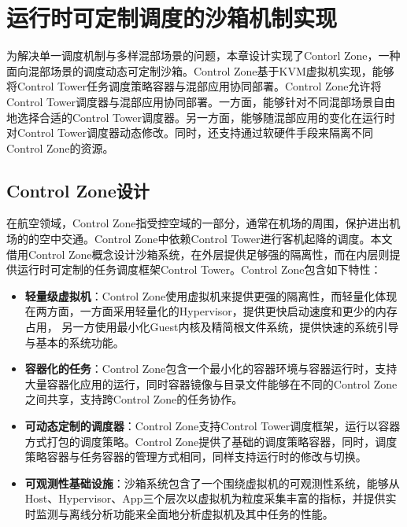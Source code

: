 \chapter{运行时可定制调度的沙箱机制实现}\label{chap:control_zone}

为解决单一调度机制与多样混部场景的问题，本章设计实现了Contorl Zone，一种面向混部场景的调度动态可定制沙箱。Control Zone基于KVM虚拟机实现，能够将Control Tower任务调度策略容器与混部应用协同部署。Control Zone允许将Control Tower调度器与混部应用协同部署。一方面，能够针对不同混部场景自由地选择合适的Control Tower调度器。另一方面，能够随混部应用的变化在运行时对Control Tower调度器动态修改。同时，还支持通过软硬件手段来隔离不同Control Zone的资源。

\section{Control Zone设计}



在航空领域，Control Zone指受控空域的一部分，通常在机场的周围，保护进出机场的的空中交通。Control Zone中依赖Control Tower进行客机起降的调度。本文借用Control Zone概念设计沙箱系统，在外层提供足够强的隔离性，而在内层则提供运行时可定制的任务调度框架Control Tower。Control Zone包含如下特性：

\begin{itemize}
    \item \textbf{轻量级虚拟机}：Control Zone使用虚拟机来提供更强的隔离性，而轻量化体现在两方面，一方面采用轻量化的Hypervisor，提供更快启动速度和更少的内存占用， 另一方使用最小化Guest内核及精简根文件系统，提供快速的系统引导与基本的系统功能。
    \item \textbf{容器化的任务}：Control Zone包含一个最小化的容器环境与容器运行时，支持大量容器化应用的运行，同时容器镜像与目录文件能够在不同的Control Zone之间共享，支持跨Control Zone的任务协作。
    \item \textbf{可动态定制的调度器}：Control Zone支持Control Tower调度框架，运行以容器方式打包的调度策略。Control Zone提供了基础的调度策略容器，同时，调度策略容器与任务容器的管理方式相同，同样支持运行时的修改与切换。
    \item \textbf{可观测性基础设施}：沙箱系统包含了一个围绕虚拟机的可观测性系统，能够从Host、Hypervisor、App三个层次以虚拟机为粒度采集丰富的指标，并提供实时监测与离线分析功能来全面地分析虚拟机及其中任务的性能。
\end{itemize}

